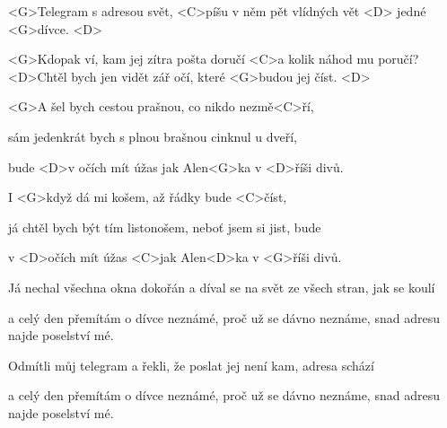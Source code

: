 
 \zs

<G>Telegram s adresou svět, <C>píšu v něm pět vlídných vět
<D> jedné <G>dívce. <D>

<G>Kdopak ví, kam jej zítra pošta doručí <C>a kolik náhod mu poručí? 
<D>Chtěl bych jen vidět zář očí, které <G>budou jej číst. <D>

\ks
\zr

<G>A šel bych cestou prašnou, co nikdo nezmě<C>ří,

sám jedenkrát bych s plnou brašnou cinknul u dveří,

bude <D>v očích mít úžas jak Alen<G>ka v <D>říši divů.

I <G>když dá mi košem, až řádky bude <C>číst,

já chtěl bych být tím listonošem, neboť jsem si jist, bude

v <D>očích mít úžas <C>jak Alen<D>ka v <G>říši divů. 

\kr
\zs

Já nechal všechna okna dokořán a díval se na svět ze všech stran, jak se koulí

a celý den přemítám o dívce neznámé, proč už se dávno neznáme, snad adresu 
najde poselství mé. 

\ks
\zr \kr
\zs

Odmítli můj telegram a řekli, že poslat jej není kam, adresa schází

a celý den přemítám o dívce neznámé, proč už se dávno neznáme, snad adresu 
najde poselství mé.

\ks

\zr \kr

\kp
